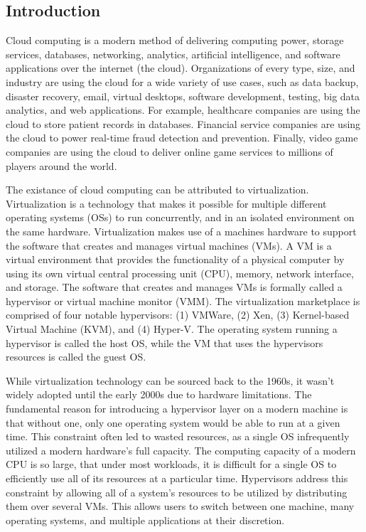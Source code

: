 \documentclass{report}
\begin{document}
\begin{spacing}{1.5}


\newpage
\chapter{Introduction}


{\large
Cloud computing is a modern method of delivering computing power, storage services, databases, networking, analytics, artificial intelligence, and software applications over the internet (the cloud). Organizations of every type, size, and industry are using the cloud for a wide variety of use cases, such as data backup, disaster recovery, email, virtual desktops, software development, testing, big data analytics, and web applications. For example, healthcare companies are using the cloud to store patient records in databases. Financial service companies are using the cloud to power real-time fraud detection and prevention. Finally, video game companies are using the cloud to deliver online game services to millions of players around the world.
\newline
}

{\large
The existance of cloud computing can be attributed to virtualization. Virtualization is a technology that makes it possible for multiple different operating systems (OSs) to run concurrently, and in an isolated environment on the same hardware. Virtualization makes use of a machines hardware to support the software that creates and manages virtual machines (VMs). A VM is a virtual environment that provides the functionality of a physical computer by using its own virtual central processing unit (CPU), memory, network interface, and storage. The software that creates and manages VMs is formally called a hypervisor or virtual machine monitor (VMM). The virtualization marketplace is comprised of four notable hypervisors: (1) VMWare, (2) Xen, (3) Kernel-based Virtual Machine (KVM), and (4) Hyper-V. The operating system running a hypervisor is called the host OS, while the VM that uses the hypervisors resources is called the guest OS.
\newline
}

{\large
While virtualization technology can be sourced back to the 1960s, it wasn’t widely adopted until the early 2000s due to hardware limitations. The fundamental reason for introducing a hypervisor layer on a modern machine is that without one, only one operating system would be able to run at a given time. This constraint often led to wasted resources, as a single OS infrequently utilized a modern hardware’s full capacity. The computing capacity of a modern CPU is so large, that under most workloads, it is difficult for a single OS to efficiently use all of its resources at a particular time. Hypervisors address this constraint by allowing all of a system’s resources to be utilized by distributing them over several VMs. This allows users to switch between one machine, many operating systems, and multiple applications at their discretion.
\newline
}


\end{spacing}
\end{document}
